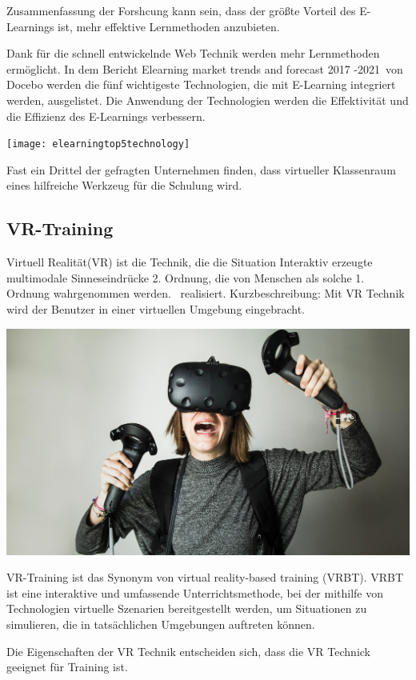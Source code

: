 Zusammenfassung der Forshcung kann sein, dass der größte Vorteil des E-Learnings ist, mehr effektive Lernmethoden anzubieten.

Dank für die schnell entwickelnde Web Technik werden mehr Lernmethoden ermöglicht. In dem Bericht \glqq Elearning market trends and forecast 2017 -2021\grqq\ von Docebo werden die fünf wichtigeste Technologien, die mit E-Learning integriert werden, ausgelistet. Die Anwendung der Technologien werden die Effektivität und die Effizienz des E-Learnings verbessern.

\texttt{[image: elearningtop5technology]}

Fast ein Drittel der gefragten Unternehmen finden, dass virtueller Klassenraum eines hilfreiche Werkzeug für die Schulung wird.

 \subsection{VR-Training}
 
Virtuell Realität(VR) ist die Technik, die die Situation \glqq Interaktiv erzeugte multimodale Sinneseindrücke 2. Ordnung, die von Menschen als solche 1. Ordnung wahrgenommen werden.\grqq\ \citep{9} realisiert. Kurzbeschreibung: Mit VR Technik wird der Benutzer in einer virtuellen Umgebung eingebracht.

\includegraphics[width=\textwidth]{images/vrhtcvive.jpg}

VR-Training ist das Synonym von virtual reality-based training (VRBT). \glqq VRBT ist eine interaktive und umfassende Unterrichtsmethode, bei der mithilfe von Technologien virtuelle Szenarien bereitgestellt werden, um Situationen zu simulieren, die in tatsächlichen Umgebungen auftreten können. \grqq\ \citep{14}

Die Eigenschaften der VR Technik entscheiden sich, dass die VR Technick geeignet für Training ist.


